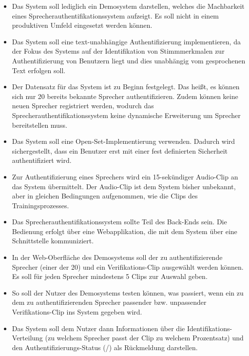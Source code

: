 \begin{itemize}
    \item Das System soll lediglich ein Demosystem darstellen, welches die Machbarkeit eines Sprecherauthentifikationssystem aufzeigt. Es soll nicht in einem produktiven Umfeld eingesetzt werden können.
    \item Das System soll eine text-unabhängige Authentifizierung implementieren, da der Fokus des Systems auf der Identifikation von Stimmmerkmalen zur Authentifizierung von Benutzern liegt und dies unabhängig vom gesprochenen Text erfolgen soll.
    \item Der Datensatz für das System ist zu Beginn festgelegt. Das heißt, es können sich nur 20 bereits bekannte Sprecher authentifizieren. Zudem können keine neuen Sprecher registriert werden, wodurch das Sprecherauthentifikationssystem keine dynamische Erweiterung um Sprecher bereitstellen muss.
    \item Das System soll eine Open-Set-Implementierung verwenden. Dadurch wird sichergestellt, dass ein Benutzer erst mit einer fest definierten Sicherheit authentifiziert wird.
    \item Zur Authentifizierung eines Sprechers wird ein 15-sekündiger Audio-Clip an das System übermittelt. Der Audio-Clip ist dem System bisher unbekannt, aber in gleichen Bedingungen aufgenommen, wie die Clips des Trainingsprozesses.
    \item Das Sprecherauthentifikationssystem sollte Teil des Back-Ends sein. Die Bedienung erfolgt über eine Webapplikation, die mit dem System über eine Schnittstelle kommuniziert.
    \item In der Web-Oberfläche des Demosystems soll der zu authentifizierende Sprecher (einer der 20) und ein Verifikations-Clip ausgewählt werden können. Es soll für jeden Sprecher mindestens 5 Clips zur Auswahl geben.
    \item So soll der Nutzer des Demosystems testen können, was passiert, wenn ein zu dem zu authentifizierenden Sprecher passender bzw. unpassender Verifikations-Clip ins System gegeben wird.
    \item Das System soll dem Nutzer dann Informationen über die Identifikations-Verteilung (zu welchem Sprecher passt der Clip zu welchem Prozentsatz) und den Authentifizierungs-Status (/) als Rückmeldung darstellen.
\end{itemize}

\textauthor{\vJB,}{\vLB}{}


